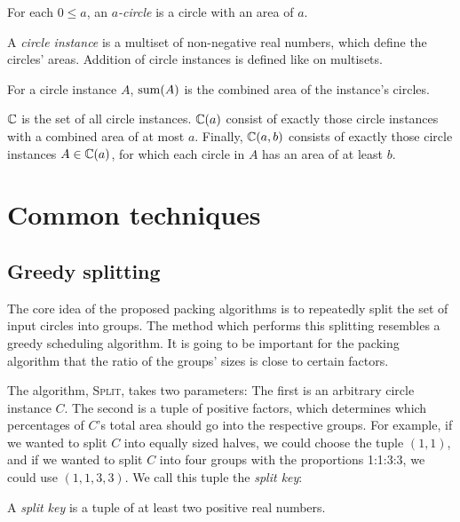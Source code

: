 \documentclass[%
    a4paper,              %
    style=screen,          %
    bibliography=totoc,   %
    nexus,                %
    lnum,                 %
    extramargin,          %
]{tubsbook}
\begin{document}
\begin{definition}
    For each $0 \le a$, an \emph{$a$-circle} is a circle with an area of $a$.
\end{definition}

\begin{definition}
    A \emph{circle instance} is a multiset of non-negative real numbers, which define the circles' areas. Addition of circle instances is defined like on multisets.
\end{definition}

\begin{definition}
    For a circle instance $A$, $\operatorname{sum}(A)$ is the combined area of the instance's circles.
\end{definition}

\begin{definition}
    $\mathbb{C}$ is the set of all circle instances. $\mathbb{C}(a)$ consist of exactly those circle instances with a combined area of at most $a$. Finally, $\mathbb{C}(a,b)$ consists of exactly those circle instances $A \in \mathbb{C}(a)$, for which each circle in $A$ has an area of at least $b$.
\end{definition}

\chapter{Common techniques}

\section{Greedy splitting}

The core idea of the proposed packing algorithms is to repeatedly split the set of input circles into groups. The method which performs this splitting resembles a greedy scheduling algorithm. It is going to be important for the packing algorithm that the ratio of the groups' sizes is close to certain factors.

The algorithm, \textsc{Split}, takes two parameters: The first is an arbitrary circle instance $C$. The second is a tuple of positive factors, which determines which percentages of $C$'s total area should go into the respective groups. For example, if we wanted to split $C$ into equally sized halves, we could choose the tuple $(1,1)$, and if we wanted to split $C$ into four groups with the proportions 1:1:3:3, we could use $(1,1,3,3)$. We call this tuple the \emph{split key}:

\begin{definition}
    A \emph{split key} is a tuple of at least two positive real numbers.
\end{definition}
\end{document}
